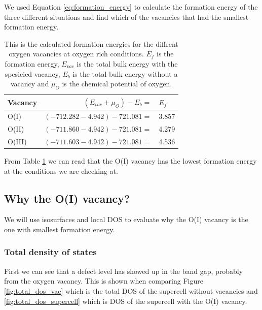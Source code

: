 We used Equation \ref{eq:formation_energy} to calculate the formation energy of the three different situations and find which of the vacancies that had the smallest formation energy. 

\begin{table}[H]\caption{This is the calculated formation energies for the diffrent oxygen vacancies at oxygen rich conditions. $E_f$ is the formation energy, $E_{vac}$ is the total bulk energy with the spesicied vacancy, $E_b$ is the total bulk energy without a vacancy and $\mu_O$ is the chemical potential of oxygen. }\label{tab:energy_formation}
\begin{tabular}{l|rl}
\footnotesize Vacancy&$(E_{vac} + \mu_O)- E_b = $ &$E_f$ \\ \hline
\small O(I)&$(-712.282 -4.942)-721.081 =$ &3.857\\
\small O(II)&$(-711.860 -4.942)-721.081 =$ &4.279\\
\small O(III)&$(-711.603 -4.942)-721.081 =$ &4.536\\
\end{tabular}
\end{table}

From Table \ref{tab:energy_formation} we can read that the O(I) vacancy has the lowest formation energy at the conditions we are checking at.

\subsection{Why the O(I) vacancy?}

We will use isosurfaces and local DOS to evaluate why the O(I) vacancy is the one with smallest formation energy.

\subsubsection{Total density of states}

First we can see that a defect level has showed up in the band gap, probably from the oxygen vacancy. This is shown when comparing Figure \ref{fig:total_dos_vac} which is the total DOS of the supercell without vacancies and \ref{fig:total_dos_supercell} which is DOS of the supercell with the O(I) vacancy.

